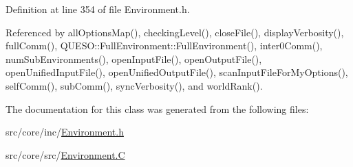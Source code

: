 Definition at line 354 of file Environment.\-h.



Referenced by all\-Options\-Map(), checking\-Level(), close\-File(), display\-Verbosity(), full\-Comm(), Q\-U\-E\-S\-O\-::\-Full\-Environment\-::\-Full\-Environment(), inter0\-Comm(), num\-Sub\-Environments(), open\-Input\-File(), open\-Output\-File(), open\-Unified\-Input\-File(), open\-Unified\-Output\-File(), scan\-Input\-File\-For\-My\-Options(), self\-Comm(), sub\-Comm(), sync\-Verbosity(), and world\-Rank().



The documentation for this class was generated from the following files\-:\begin{DoxyCompactItemize}
\item 
src/core/inc/\hyperlink{_environment_8h}{Environment.\-h}\item 
src/core/src/\hyperlink{_environment_8_c}{Environment.\-C}\end{DoxyCompactItemize}
